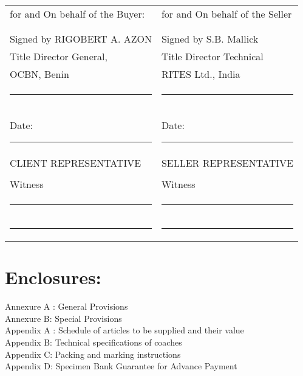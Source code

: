 \documentclass{standalone}
\begin{document}
\begin{tabular}{p{5cm}p{5cm}}
\hline

for and On behalf of the Buyer: 	& for and On behalf of the Seller 	\\
				&						\\
				&				\\
Signed by RIGOBERT A. AZON 	& Signed by S.B. Mallick  	\\
Title Director General,		& Title Director Technical 	\\
OCBN, Benin 			&  RITES Ltd., India 		 \\
\rule{6cm}{.2pt} 		& \rule{6cm}{.2pt} 		\\
Date: \rule{2.4cm}{.2pt}	& Date: \rule{2.4cm}{.2pt}	\\
CLIENT REPRESENTATIVE      	& SELLER REPRESENTATIVE		\\
				&				\\
Witness				& Witness			\\
\rule{6cm}{.2pt} 		& \rule{6cm}{.2pt} 		\\
\rule{6cm}{.2pt} 		& \rule{6cm}{.2pt} 		\\
\hline
\end{tabular}





 

\section*{Enclosures:}

Annexure A : General   Provisions\\
Annexure B:  Special Provisions\\
Appendix  A :   Schedule of  articles to be supplied and their value\\
Appendix  B:   Technical specifications of coaches\\
Appendix  C:  Packing and marking instructions\\
Appendix  D:  Specimen Bank Guarantee for Advance Payment\\
\end{document}
